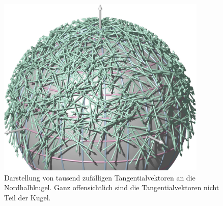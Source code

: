 %
%
%
\begin{figure}
\centering
\includegraphics[width=10cm]{chapters/020-koordinaten/images/tangentialvektoren.jpg}
\caption{Darstellung von tausend zufälligen Tangentialvektoren an die
Nordhalbkugel.
Ganz offensichtlich sind die Tangentialvektoren nicht Teil der Kugel.
\label{buch:koordinaten:fig:tangentialvektoren}}
\end{figure}
